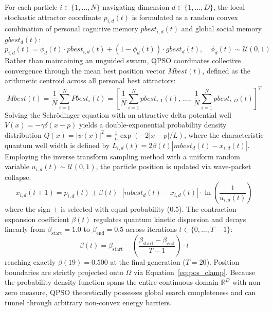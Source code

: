 \documentclass[10pt]{article}
\begin{document}
For each particle $i \in \{1, \dots, N\}$ navigating dimension $d \in \{1, \dots, D\}$, the local stochastic attractor coordinate $p_{i,d}(t)$ is formulated as a random convex combination of personal cognitive memory $pbest_{i,d}(t)$ and global social memory $gbest_d(t)$:
\begin{equation}
p_{i,d}(t) = \phi_d(t) \cdot pbest_{i,d}(t) + (1 - \phi_d(t)) \cdot gbest_d(t), \quad \phi_d(t) \sim \mathcal{U}(0, 1) \label{eq:qpso_attractor}
\end{equation}
Rather than maintaining an unguided swarm, QPSO coordinates collective convergence through the mean best position vector $Mbest(t)$, defined as the arithmetic centroid across all personal best attractors:
\begin{equation}
Mbest(t) = \frac{1}{N} \sum_{i=1}^N Pbest_i(t) = \left[ \frac{1}{N}\sum_{i=1}^N pbest_{i,1}(t), \, \dots, \, \frac{1}{N}\sum_{i=1}^N pbest_{i,D}(t) \right]^T \label{eq:qpso_mbest}
\end{equation}
Solving the Schr{\"o}dinger equation with an attractive delta potential well $V(x) = -\gamma \delta(x - p)$ yields a double-exponential probability density distribution $Q(x) = |\psi(x)|^2 = \frac{1}{L} \exp\left( -2|x - p| / L \right)$, where the characteristic quantum well width is defined by $L_{i,d}(t) = 2 \beta(t) |mbest_d(t) - x_{i,d}(t)|$. Employing the inverse transform sampling method with a uniform random variable $u_{i,d}(t) \sim \mathcal{U}(0, 1)$, the particle position is updated via wave-packet collapse:
\begin{equation}
x_{i,d}(t+1) = p_{i,d}(t) \pm \beta(t) \cdot |mbest_d(t) - x_{i,d}(t)| \cdot \ln\left( \frac{1}{u_{i,d}(t)} \right) \label{eq:qpso_pos}
\end{equation}
where the sign $\pm$ is selected with equal probability ($0.5$). The contraction-expansion coefficient $\beta(t)$ regulates quantum kinetic dispersion and decays linearly from $\beta_{\mathrm{start}} = 1.0$ to $\beta_{\mathrm{end}} = 0.5$ across iterations $t \in \{0, \dots, T-1\}$:
\begin{equation}
\beta(t) = \beta_{\mathrm{start}} - \left( \frac{\beta_{\mathrm{start}} - \beta_{\mathrm{end}}}{T - 1} \right) \cdot t \label{eq:qpso_beta}
\end{equation}
reaching exactly $\beta(19) = 0.500$ at the final generation ($T = 20$). Position boundaries are strictly projected onto $\Omega$ via Equation~\eqref{eq:pos_clamp}. Because the probability density function spans the entire continuous domain $\mathbb{R}^D$ with non-zero measure, QPSO theoretically possesses global search completeness and can tunnel through arbitrary non-convex energy barriers.
\end{document}
